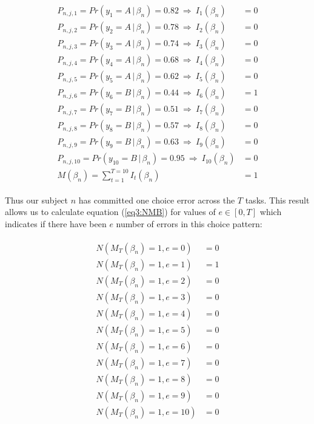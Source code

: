 \documentclass[../main.tex]{subfiles}
\begin{document}
\begin{align}
	\label{eq3:example_MTBn}
	\begin{split}
		P_{n,j,1}  = Pr(y_1 = A    \,|\, \beta_n) = 0.82 ~ \Rightarrow ~ I_{1}(\beta_n)  &= 0 \\
		P_{n,j,2}  = Pr(y_2 = A    \,|\, \beta_n) = 0.78 ~ \Rightarrow ~ I_{2}(\beta_n)  &= 0 \\
		P_{n,j,3}  = Pr(y_3 = A    \,|\, \beta_n) = 0.74 ~ \Rightarrow ~ I_{3}(\beta_n)  &= 0 \\
		P_{n,j,4}  = Pr(y_4 = A    \,|\, \beta_n) = 0.68 ~ \Rightarrow ~ I_{4}(\beta_n)  &= 0 \\
		P_{n,j,5}  = Pr(y_5 = A    \,|\, \beta_n) = 0.62 ~ \Rightarrow ~ I_{5}(\beta_n)  &= 0 \\
		P_{n,j,6}  = Pr(y_6 = B    \,|\, \beta_n) = 0.44 ~ \Rightarrow ~ I_{6}(\beta_n)  &= 1 \\
		P_{n,j,7}  = Pr(y_7 = B    \,|\, \beta_n) = 0.51 ~ \Rightarrow ~ I_{7}(\beta_n)  &= 0 \\
		P_{n,j,8}  = Pr(y_8 = B    \,|\, \beta_n) = 0.57 ~ \Rightarrow ~ I_{8}(\beta_n)  &= 0 \\
		P_{n,j,9}  = Pr(y_9 = B    \,|\, \beta_n) = 0.63 ~ \Rightarrow ~ I_{9}(\beta_n)  &= 0 \\
		P_{n,j,10} = Pr(y_{10} = B \,|\, \beta_n) = 0.95 ~ \Rightarrow ~ I_{10}(\beta_n) &= 0 \\
		                                M(\beta_n) = \sum_{t = 1}^{T = 10}{I_t(\beta_n)} &= 1
	\end{split}
\end{align}

\noindent Thus our subject $n$ has committed one choice error across the $T$ tasks.
This result allows us to calculate equation (\ref{eq3:NMB}) for values of $e \in [ 0, T ]$ which indicates if there have been $e$ number of errors in this choice pattern:

\begin{align}
	\label{eq3:example_NMB}
	\begin{split}
		N( M_T(\beta_n) = 1, e = 0 )  &= 0 \\
		N( M_T(\beta_n) = 1, e = 1 )  &= 1 \\
		N( M_T(\beta_n) = 1, e = 2 )  &= 0 \\
		N( M_T(\beta_n) = 1, e = 3 )  &= 0 \\
		N( M_T(\beta_n) = 1, e = 4 )  &= 0 \\
		N( M_T(\beta_n) = 1, e = 5 )  &= 0 \\
		N( M_T(\beta_n) = 1, e = 6 )  &= 0 \\
		N( M_T(\beta_n) = 1, e = 7 )  &= 0 \\
		N( M_T(\beta_n) = 1, e = 8 )  &= 0 \\
		N( M_T(\beta_n) = 1, e = 9 )  &= 0 \\
		N( M_T(\beta_n) = 1, e = 10 ) &= 0 \\
	\end{split}
\end{align}
\end{document}
